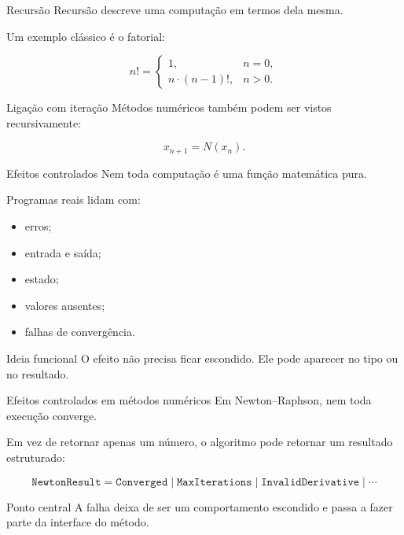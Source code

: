 \documentclass[aspectratio=169,11pt]{beamer}
\begin{document}
\begin{frame}{Recursão}
  Recursão descreve uma computação em termos dela mesma.

  \vspace{0.15cm}
  Um exemplo clássico é o fatorial:

  \begin{equation*}
    n! =
    \begin{cases}
      1, & n=0,\\
      n\cdot(n-1)!, & n>0.
    \end{cases}
  \end{equation*}

  \begin{exampleblock}{Ligação com iteração}
    Métodos numéricos também podem ser vistos recursivamente:
  \end{exampleblock}

  \begin{equation*}
    x_{n+1}=N(x_n).
  \end{equation*}
\end{frame}

\begin{frame}{Efeitos controlados}
  Nem toda computação é uma função matemática pura.

  \vspace{0.2cm}
  Programas reais lidam com:

  \begin{itemize}
    \item erros;
    \item entrada e saída;
    \item estado;
    \item valores ausentes;
    \item falhas de convergência.
  \end{itemize}

  \begin{block}{Ideia funcional}
    O efeito não precisa ficar escondido. Ele pode aparecer no tipo ou no resultado.
  \end{block}
\end{frame}

\begin{frame}{Efeitos controlados em métodos numéricos}
  Em Newton--Raphson, nem toda execução converge.

  \vspace{0.2cm}
  Em vez de retornar apenas um número, o algoritmo pode retornar um resultado estruturado:

  \begin{equation*}
    \texttt{NewtonResult}
    =
    \texttt{Converged}
    \mid
    \texttt{MaxIterations}
    \mid
    \texttt{InvalidDerivative}
    \mid\cdots
  \end{equation*}

  \begin{alertblock}{Ponto central}
    A falha deixa de ser um comportamento escondido e passa a fazer parte da interface do método.
  \end{alertblock}
\end{frame}
\end{document}
